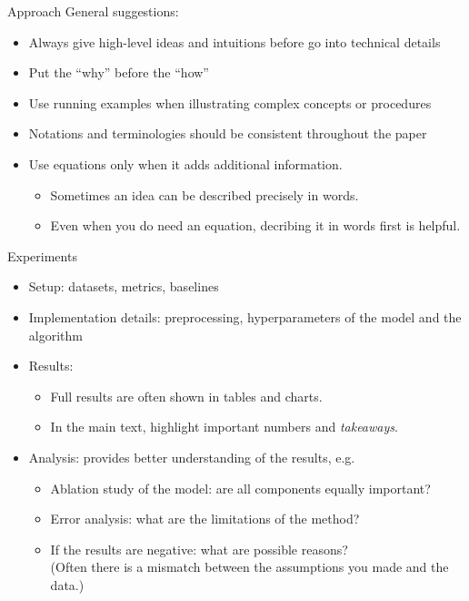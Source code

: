 \documentclass[usenames,dvipsnames,notes]{beamer}
\begin{document}
\begin{frame}
    {Approach}
    General suggestions:\\
    \begin{itemize}
        \item Always give high-level ideas and intuitions before go into technical details
        \item Put the ``why'' before the ``how''
        \item Use running examples when illustrating complex concepts or procedures
        \item Notations and terminologies should be consistent throughout the paper
        \item Use equations only when it adds additional information.
            \begin{itemize}
                \item Sometimes an idea can be described precisely in words.
                \item Even when you do need an equation, decribing it in words first is helpful.
            \end{itemize}
    \end{itemize}
\end{frame}

\begin{frame}
    {Experiments}
    \begin{itemize}
        \item Setup: datasets, metrics, baselines
        \item Implementation details: preprocessing, hyperparameters of the model and the algorithm
        \item Results:
            \begin{itemize}
                \item Full results are often shown in tables and charts.
                \item In the main text, highlight important numbers and \emph{takeaways}.
            \end{itemize}
        \item Analysis: provides better understanding of the results, e.g.
            \begin{itemize}
                \item Ablation study of the model: are all components equally important?
                \item Error analysis: what are the limitations of the method?
                \item If the results are negative: what are possible reasons?\\
                    (Often there is a mismatch between the assumptions you made and the data.)
            \end{itemize}
    \end{itemize}
\end{frame}
\end{document}
